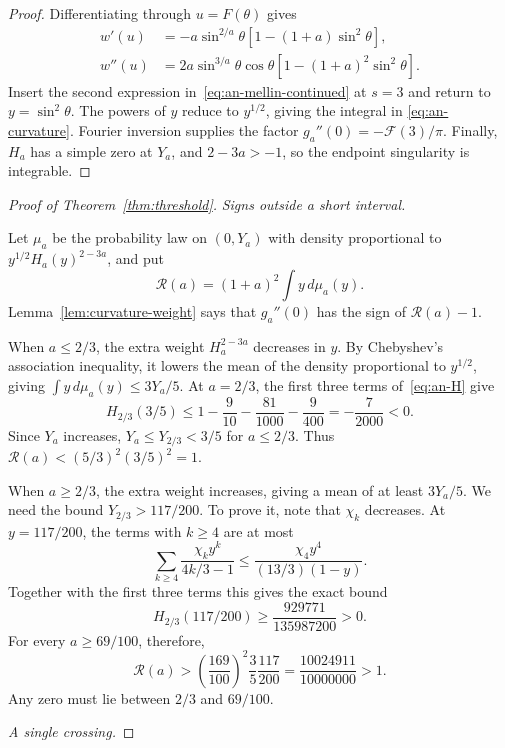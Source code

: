 \begin{proof}
Differentiating through $u=F(\theta)$ gives
\[
 \begin{split}
 w'(u)&=-a\sin^{2/a}\theta
                  [1-(1+a)\sin^2\theta],\\
 w''(u)&=2a\sin^{3/a}\theta\cos\theta
                  [1-(1+a)^2\sin^2\theta].
 \end{split}
\]
Insert the second expression in~\eqref{eq:an-mellin-continued}
at $s=3$ and return to $y=\sin^2\theta$.
The powers of $y$ reduce to $y^{1/2}$, giving the integral in
\eqref{eq:an-curvature}. Fourier inversion supplies the factor
$g_a''(0)=-\mathcal F(3)/\pi$.
Finally, $H_a$ has a simple zero at $Y_a$, and $2-3a>-1$,
so the endpoint singularity is integrable.
\end{proof}

\begin{proof}[Proof of Theorem~\ref{thm:threshold}]
\emph{Signs outside a short interval.}

Let $\mu_a$ be the probability law on $(0,Y_a)$ with density proportional to
$y^{1/2}H_a(y)^{2-3a}$, and put
\begin{equation}\label{eq:an-score}
 \mathcal R(a)=(1+a)^2\int y\,d\mu_a(y).
\end{equation}
Lemma~\ref{lem:curvature-weight} says that $g_a''(0)$ has the sign
of $\mathcal R(a)-1$.

When $a\le2/3$, the extra weight $H_a^{2-3a}$ decreases in $y$.
By Chebyshev's association inequality, it lowers the mean of the density proportional to
$y^{1/2}$, giving $\int y\,d\mu_a(y)\le3Y_a/5$.
At $a=2/3$, the first three terms of~\eqref{eq:an-H} give
\[
 H_{2/3}(3/5)
 \le1-\frac9{10}-\frac{81}{1000}-\frac9{400}
 =-\frac7{2000}<0.
\]
Since $Y_a$ increases, $Y_a\le Y_{2/3}<3/5$ for $a\le2/3$.
Thus $\mathcal R(a)<(5/3)^2(3/5)^2=1$.

When $a\ge2/3$, the extra weight increases, giving a mean of at least
$3Y_a/5$. We need the bound
$Y_{2/3}>117/200$. To prove it, note that $\chi_k$ decreases.
At $y=117/200$, the terms with $k\ge4$ are at most
\[
 \sum_{k\ge4}\frac{\chi_ky^k}{4k/3-1}
 \le\frac{\chi_4y^4}{(13/3)(1-y)}.
\]
Together with the first three terms this gives the exact bound
\[
 H_{2/3}(117/200)\ge\frac{929771}{135987200}>0.
\]
For every $a\ge69/100$, therefore,
\[
 \mathcal R(a)>
 \left(\frac{169}{100}\right)^2\frac35\frac{117}{200}
 =\frac{10024911}{10000000}>1.
\]
Any zero must lie between $2/3$ and $69/100$.

\emph{A single crossing.}


\end{proof}
